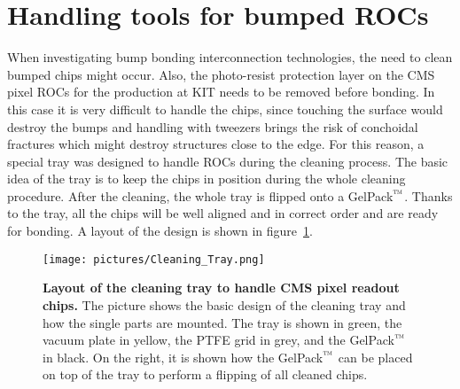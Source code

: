 \section{Handling tools for bumped \acl{ROC}s}
When investigating bump bonding interconnection technologies, the need to clean bumped chips might occur. Also, the photo-resist protection layer on the \ac{CMS} pixel \acs{ROC}s for the production at \ac{KIT} needs to be removed before bonding. In this case it is very difficult to handle the chips, since touching the surface would destroy the bumps and handling with tweezers brings the risk of conchoidal fractures which might destroy structures close to the edge. For this reason, a special tray was designed to handle \acs{ROC}s during the cleaning process. The basic idea of the tray is to keep the chips in position during the whole cleaning procedure. After the cleaning, the whole tray is flipped onto a GelPack$\rm{\symbTM}$. Thanks to the tray, all the chips will be well aligned and in correct order and are ready for bonding. A layout of the design is shown in figure~\ref{pic:cleaning_tray_layout}.\\
\begin{figure}
\begin{center}
\texttt{[image: pictures/Cleaning\_Tray.png]}
\end{center}
\caption[Layout of the cleaning tray to handle CMS pixel readout chips.]{\textbf{Layout of the cleaning tray to handle \ac{CMS} pixel readout chips.} The picture shows the basic design of the cleaning tray and how the single parts are mounted. The tray is shown in green, the vacuum plate in yellow, the \acs{PTFE} grid in grey, and the GelPack$\rm{\symbTM}$ in black. On the right, it is shown how the GelPack$\rm{\symbTM}$ can be placed on top of the tray to perform a flipping of all cleaned chips.}\label{pic:cleaning_tray_layout}
\end{figure}
